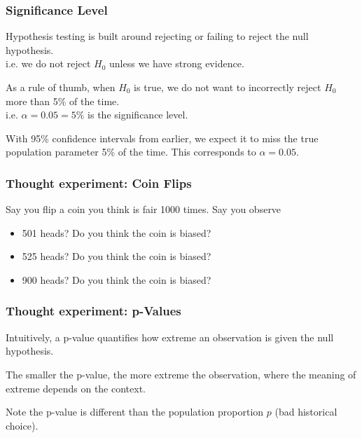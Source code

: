\documentclass[slides]{beamer}
\newcommand{\blue}[1]{\textcolor{blue2}{#1}}
\begin{document}
\begin{frame}
\frametitle{Significance Level}

%
%
 Hypothesis testing is built around rejecting or failing to reject the null hypothesis.\\
\pause i.e. we do not reject $H_0$ unless we have \blue{strong evidence}.

\pause \vspace{0.5cm}

As a rule of thumb, when $H_0$ is true, we do not want to incorrectly reject $H_0$ more than 5\% of the time.\\
i.e. $\alpha = 0.05 = 5\%$ is the \blue{significance level}.  

\pause \vspace{0.5cm}

With 95\% confidence intervals from earlier, we expect it to miss the true population parameter 5\% of the time.  This corresponds to $\alpha=0.05$.   

\end{frame}


\begin{frame}
\frametitle{Thought experiment: Coin Flips}
Say you flip a coin you think is fair 1000 times.  Say you observe
\begin{itemize}
\pause \item 501 heads? Do you think the coin is biased?
\pause \item 525 heads? Do you think the coin is biased?
\pause \item 900 heads? Do you think the coin is biased?
\end{itemize}

\end{frame}


\begin{frame}
\frametitle{Thought experiment: p-Values}

Intuitively, a \blue{p-value} quantifies how \blue{extreme} an observation is given the null hypothesis.  
  
\vskip 0.25cm

\pause The smaller the p-value, the more \blue{extreme} the observation, where the meaning of extreme depends on the context.  

\vskip 0.25cm

\pause Note the p-value is different than the population proportion $p$ (bad historical choice).

\end{frame}
\end{document}
